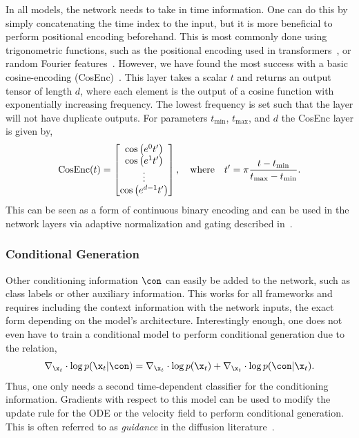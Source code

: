 In all models, the network needs to take in time information.
One can do this by simply concatenating the time index to the input, but it is more beneficial to perform positional encoding beforehand.
This is most commonly done using trigonometric functions, such as the positional encoding used in transformers~\cite{Attention}, or random Fourier features~\cite{FourierFeaturesLet}.
However, we have found the most success with a basic cosine-encoding (CosEnc)~\cite{ImplicitQuantileNetworks}.
This layer takes a scalar $t$ and returns an output tensor of length $d$, where each element is the output of a cosine function with exponentially increasing frequency.
The lowest frequency is set such that the layer will not have duplicate outputs.
For parameters $t_\text{min}$, $t_\text{max}$, and $d$ the CosEnc layer is given by,
\begin{equation}
    \label{eq:cosine_encoding}
    \text{CosEnc}(t) =
    \begin{bmatrix}
        \cos\left(e^0 t'\right) \\
        \cos\left(e^1 t'\right) \\
        \vdots                  \\
        \cos\left(e^{d-1} t'\right)
    \end{bmatrix}, \quad \text{where} \quad t' = \pi \frac{t - t_\text{min}}{t_\text{max} - t_\text{min}}. \\
\end{equation}
This can be seen as a form of continuous binary encoding and can be used in the network layers via adaptive normalization and gating described in~.

\subsubsection{Conditional Generation}

Other conditioning information $\con$ can easily be added to the network, such as class labels or other auxiliary information.
This works for all frameworks and requires including the context information with the network inputs, the exact form depending on the model's architecture.
Interestingly enough, one does not even have to train a conditional model to perform conditional generation due to the relation,
\begin{equation}
    \label{eq:conditional_generation}
    \nabla_{\x_t} \cdot \log p(\x_t | \con) = \nabla_{\x_t} \cdot \log p(\x_t) + \nabla_{\x_t} \cdot \log p(\con | \x_t).
\end{equation}
Thus, one only needs a second time-dependent classifier for the conditioning information.
Gradients with respect to this model can be used to modify the update rule for the ODE or the velocity field to perform conditional generation.
This is often referred to as \textit{guidance} in the diffusion literature~\cite{DiffusionBeatsGANS}.

